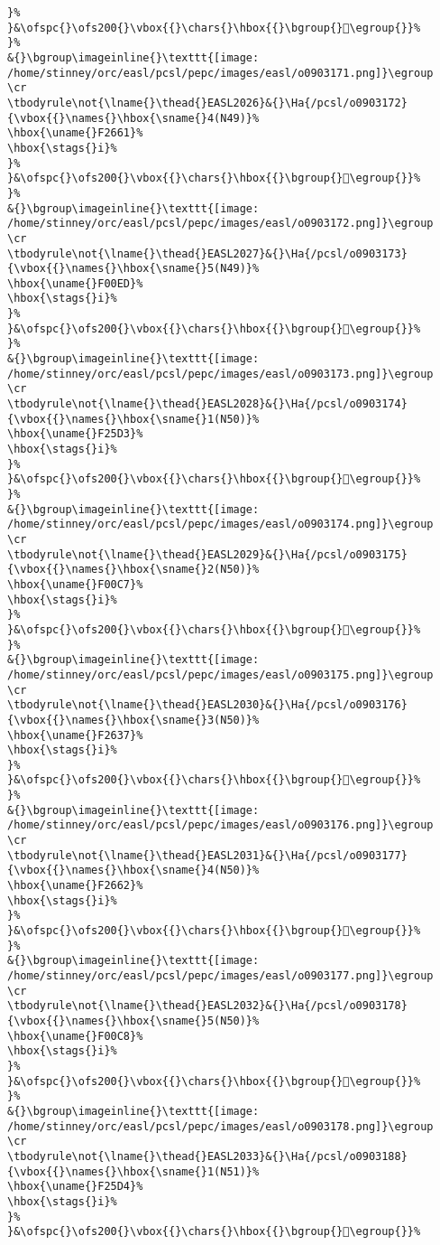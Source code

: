 \begin{verbatim}
}%
}&\ofspc{}\ofs200{}\vbox{{}\chars{}\hbox{{}\bgroup{}󰃆\egroup{}}%
}%
&{}\bgroup\imageinline{}\texttt{[image: /home/stinney/orc/easl/pcsl/pepc/images/easl/o0903171.png]}\egroup
\cr
\tbodyrule\not{\lname{}\thead{}EASL2026}&{}\Ha{/pcsl/o0903172}{\vbox{{}\names{}\hbox{\sname{}4(N49)}%
\hbox{\uname{}F2661}%
\hbox{\stags{}i}%
}%
}&\ofspc{}\ofs200{}\vbox{{}\chars{}\hbox{{}\bgroup{}󲙡\egroup{}}%
}%
&{}\bgroup\imageinline{}\texttt{[image: /home/stinney/orc/easl/pcsl/pepc/images/easl/o0903172.png]}\egroup
\cr
\tbodyrule\not{\lname{}\thead{}EASL2027}&{}\Ha{/pcsl/o0903173}{\vbox{{}\names{}\hbox{\sname{}5(N49)}%
\hbox{\uname{}F00ED}%
\hbox{\stags{}i}%
}%
}&\ofspc{}\ofs200{}\vbox{{}\chars{}\hbox{{}\bgroup{}󰃭\egroup{}}%
}%
&{}\bgroup\imageinline{}\texttt{[image: /home/stinney/orc/easl/pcsl/pepc/images/easl/o0903173.png]}\egroup
\cr
\tbodyrule\not{\lname{}\thead{}EASL2028}&{}\Ha{/pcsl/o0903174}{\vbox{{}\names{}\hbox{\sname{}1(N50)}%
\hbox{\uname{}F25D3}%
\hbox{\stags{}i}%
}%
}&\ofspc{}\ofs200{}\vbox{{}\chars{}\hbox{{}\bgroup{}󲗓\egroup{}}%
}%
&{}\bgroup\imageinline{}\texttt{[image: /home/stinney/orc/easl/pcsl/pepc/images/easl/o0903174.png]}\egroup
\cr
\tbodyrule\not{\lname{}\thead{}EASL2029}&{}\Ha{/pcsl/o0903175}{\vbox{{}\names{}\hbox{\sname{}2(N50)}%
\hbox{\uname{}F00C7}%
\hbox{\stags{}i}%
}%
}&\ofspc{}\ofs200{}\vbox{{}\chars{}\hbox{{}\bgroup{}󰃇\egroup{}}%
}%
&{}\bgroup\imageinline{}\texttt{[image: /home/stinney/orc/easl/pcsl/pepc/images/easl/o0903175.png]}\egroup
\cr
\tbodyrule\not{\lname{}\thead{}EASL2030}&{}\Ha{/pcsl/o0903176}{\vbox{{}\names{}\hbox{\sname{}3(N50)}%
\hbox{\uname{}F2637}%
\hbox{\stags{}i}%
}%
}&\ofspc{}\ofs200{}\vbox{{}\chars{}\hbox{{}\bgroup{}󲘷\egroup{}}%
}%
&{}\bgroup\imageinline{}\texttt{[image: /home/stinney/orc/easl/pcsl/pepc/images/easl/o0903176.png]}\egroup
\cr
\tbodyrule\not{\lname{}\thead{}EASL2031}&{}\Ha{/pcsl/o0903177}{\vbox{{}\names{}\hbox{\sname{}4(N50)}%
\hbox{\uname{}F2662}%
\hbox{\stags{}i}%
}%
}&\ofspc{}\ofs200{}\vbox{{}\chars{}\hbox{{}\bgroup{}󲙢\egroup{}}%
}%
&{}\bgroup\imageinline{}\texttt{[image: /home/stinney/orc/easl/pcsl/pepc/images/easl/o0903177.png]}\egroup
\cr
\tbodyrule\not{\lname{}\thead{}EASL2032}&{}\Ha{/pcsl/o0903178}{\vbox{{}\names{}\hbox{\sname{}5(N50)}%
\hbox{\uname{}F00C8}%
\hbox{\stags{}i}%
}%
}&\ofspc{}\ofs200{}\vbox{{}\chars{}\hbox{{}\bgroup{}󰃈\egroup{}}%
}%
&{}\bgroup\imageinline{}\texttt{[image: /home/stinney/orc/easl/pcsl/pepc/images/easl/o0903178.png]}\egroup
\cr
\tbodyrule\not{\lname{}\thead{}EASL2033}&{}\Ha{/pcsl/o0903188}{\vbox{{}\names{}\hbox{\sname{}1(N51)}%
\hbox{\uname{}F25D4}%
\hbox{\stags{}i}%
}%
}&\ofspc{}\ofs200{}\vbox{{}\chars{}\hbox{{}\bgroup{}󲗔\egroup{}}%

\end{verbatim}
